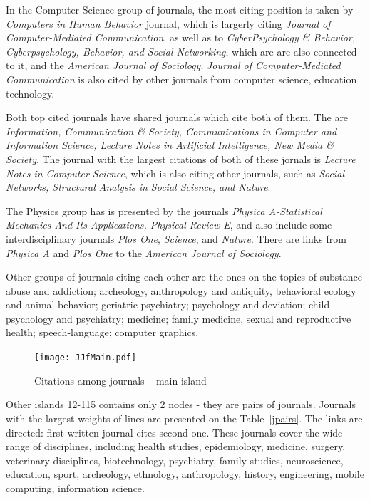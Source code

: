 \documentclass[11pt]{article} %
\begin{document}
In the Computer Science group of journals, the most citing position is taken by \textit{Computers in Human Behavior} journal, which is largerly citing \textit{Journal of Computer-Mediated Communication}, as well as to \textit{CyberPsychology \& Behavior, Cyberpsychology, Behavior, and Social Networking}, which are are also connected to it, and the \textit{American Journal of Sociology}. \textit{Journal of Computer-Mediated Communication} is also cited by other journals from computer science, education technology. \medskip 

Both top cited journals have shared journals which cite both of them. The are \textit{Information, Communication \& Society, Communications in Computer and Information Science, Lecture Notes in Artificial Intelligence, New Media \& Society}. The journal with the largest citations of both of these jornals is \textit{Lecture Notes in Computer Science}, which is also citing other journals, such as \textit{Social Networks, Structural Analysis in Social Science, and Nature}.\medskip 

The Physics group has is presented by the journals \textit{Physica A-Statistical Mechanics And Its Applications, Physical Review E}, and also include some interdisciplinary journals \textit{Plos One}, \textit{Science}, and \textit{Nature}. There are links from \textit{Physica A} and \textit{Plos One} to  the \textit{American Journal of Sociology}. \medskip  

Other groups of journals citing each other are the ones on the topics of substance abuse and addiction; archeology, anthropology and antiquity, behavioral ecology and animal behavior; geriatric psychiatry; psychology and deviation; child psychology and psychiatry; medicine; family medicine, sexual and reproductive health; speech-language; computer graphics. \medskip  

\begin{figure}
\begin{center}
\texttt{[image: JJfMain.pdf]}
\end{center}
\caption{Citations among journals -- main island} \label{jjFmain}
\end{figure}

Other islands 12-115 contains only 2 nodes - they are pairs of journals. Journals with the largest weights of lines are presented on the Table~\ref{jpairs}. The links are directed: first written journal cites second one. These journals cover the wide range of disciplines, including health studies, epidemiology, medicine, surgery, veterinary disciplines, biotechnology, psychiatry, family studies, neuroscience, education, sport, archeology, ethnology, anthropology, history, engineering, mobile computing, information science.  
\end{document}
